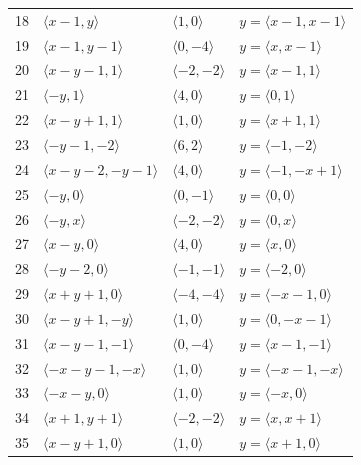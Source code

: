 \documentclass[11pt]{article}
\begin{document}
\begin{longtable}{@{}rlll@{}}
18 & $\langle x-1,y\rangle$ & $\langle 1,0\rangle$ & $y=\langle x-1,x-1\rangle$\\
19 & $\langle x-1,y-1\rangle$ & $\langle 0,-4\rangle$ & $y=\langle x,x-1\rangle$\\
20 & $\langle x-y-1,1\rangle$ & $\langle -2,-2\rangle$ & $y=\langle x-1,1\rangle$\\
21 & $\langle -y,1\rangle$ & $\langle 4,0\rangle$ & $y=\langle 0,1\rangle$\\
22 & $\langle x-y+1,1\rangle$ & $\langle 1,0\rangle$ & $y=\langle x+1,1\rangle$\\
23 & $\langle -y-1,-2\rangle$ & $\langle 6,2\rangle$ & $y=\langle -1,-2\rangle$\\
24 & $\langle x-y-2,-y-1\rangle$ & $\langle 4,0\rangle$ & $y=\langle -1,-x+1\rangle$\\
25 & $\langle -y,0\rangle$ & $\langle 0,-1\rangle$ & $y=\langle 0,0\rangle$\\
26 & $\langle -y,x\rangle$ & $\langle -2,-2\rangle$ & $y=\langle 0,x\rangle$\\
27 & $\langle x-y,0\rangle$ & $\langle 4,0\rangle$ & $y=\langle x,0\rangle$\\
28 & $\langle -y-2,0\rangle$ & $\langle -1,-1\rangle$ & $y=\langle -2,0\rangle$\\
29 & $\langle x+y+1,0\rangle$ & $\langle -4,-4\rangle$ & $y=\langle -x-1,0\rangle$\\
30 & $\langle x-y+1,-y\rangle$ & $\langle 1,0\rangle$ & $y=\langle 0,-x-1\rangle$\\
31 & $\langle x-y-1,-1\rangle$ & $\langle 0,-4\rangle$ & $y=\langle x-1,-1\rangle$\\
32 & $\langle -x-y-1,-x\rangle$ & $\langle 1,0\rangle$ & $y=\langle -x-1,-x\rangle$\\
33 & $\langle -x-y,0\rangle$ & $\langle 1,0\rangle$ & $y=\langle -x,0\rangle$\\
34 & $\langle x+1,y+1\rangle$ & $\langle -2,-2\rangle$ & $y=\langle x,x+1\rangle$\\
35 & $\langle x-y+1,0\rangle$ & $\langle 1,0\rangle$ & $y=\langle x+1,0\rangle$\\
\end{longtable}
\endgroup
\end{document}
